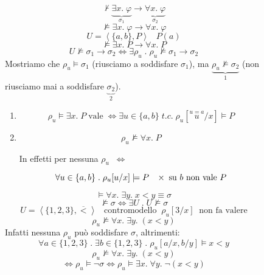 \documentclass{article}
\theoremstyle{break}
\theoremstyle{break}
\theoremstyle{break}
\theoremstyle{break}
\begin{document}
  \begin{figure}[H]
    \begin{exercise}
      \[
        \not\vdash \underbrace{\exists x.\; \varphi}_{\sigma_1}  \to  \underbrace{\forall x.\; \varphi}_{\sigma_2}
      \] 
      \[
        \not\models \exists x.\; \varphi  \to \forall x.\; \varphi 
      \] 
      \[
        U = \left<\{a,b\}, P\right> \;\;\; P(a)
      \] 
      \[
        \not\models \exists x.\; P \to \forall x.\; P
      \] 
      \[
        U \not\models \sigma_1 \to \sigma_2 \Leftrightarrow \exists \rho_u \;.\; \rho_u \not\models \sigma_1 \to \sigma_2
      \] 
      Mostriamo che \( \rho_u \models \sigma_1 \) (riusciamo a soddisfare \( \sigma_1 \)), ma
      \( \underbrace{\rho_u \not\models \sigma_2}_{1} \) (non riusciamo mai a soddisfare \( \underbrace{\sigma_2}_{2} \)).
      \begin{enumerate}
        \item 
          \[
            \rho_u \models \exists x.\; P \; \text{vale} \; \Leftrightarrow \exists u \in \{a,b\} \;t.c.\; \rho_u[\stackrel{u = a}{u}/x] \models P
          \] 
        \item \[
            \rho_u \not\models \forall x.\; P
          \] 
          \begin{center}
            In effetti per nessuna \( \rho_u \;\; \Leftrightarrow\) 
          \end{center}
          \[
            \forall u \in \{a,b\} \;.\; \rho_u[u/x] \models P \;\;\; \times \; \text{su \( b \) non vale \( P \)}
          \] 
      \end{enumerate}
    \end{exercise}
  \end{figure}

  \begin{figure}[H]
    \begin{exercise}
      \[
        \models \forall x.\; \exists y.\; x < y \equiv \sigma 
      \] 
      \[
        \not\models \sigma \Leftrightarrow \exists U \;.\; U \not\models \sigma
      \] 
      \[
        U = \left< \{1,2,3\}, \overline{<}\right> \;\;\; \text{contromodello} \;\; \rho_u[3/x] \;\; \text{non fa valere}
      \] 
      \[
        \rho_u \not\models \forall x.\; \exists y.\; (x < y)
      \] 
      Infatti nessuna \( \rho_u \) può soddisfare \( \sigma  \), altrimenti:
      \[
        \forall a \in \{1,2,3\} \;.\; \exists b \in \{1,2,3\} \;.\; \rho_u[a/x, b/y] \models x < y
      \] 
      \[
        \rho_u \not\models \forall x.\; \exists y.\; (x < y)
      \] 
      \[
        \Leftrightarrow \rho_u \models \neg \sigma \Leftrightarrow \rho_u \models \exists x.\; \forall y.\; \neg(x < y)
      \] 
    \end{exercise}
  \end{figure}
\end{document}
